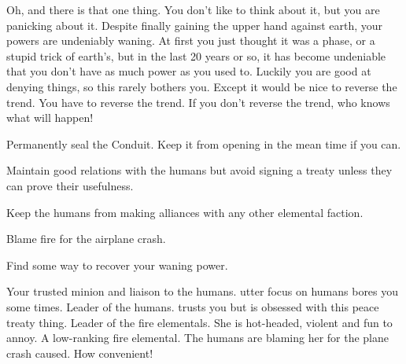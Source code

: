\documentclass[char]{elementals}
\begin{document}
Oh, and there is that one thing. You don't like to think about it, but you are panicking about it. Despite finally gaining the upper hand against earth, your powers are undeniably waning. At first you just thought it was a phase, or a stupid trick of earth's, but in the last 20 years or so, it has become undeniable that you don't have as much power as you used to. Luckily you are good at denying things, so this rarely bothers you. Except it would be nice to reverse the trend. You have to reverse the trend. If you don't reverse the trend, who knows what will happen!

\begin{itemz}[Goals]
	\item  Permanently seal the Conduit. Keep it from opening in the mean time if you can.
	\item  Maintain good relations with the humans but avoid signing a treaty unless they can prove their usefulness.
	\item  Keep the humans from making alliances with any other elemental faction.
	\item  Blame fire for the airplane crash.
	\item  Find some way to recover your waning power.
\end{itemz}

\begin{contacts}
	\contact{\cNaturalist{\intro}} Your trusted minion and liaison to the humans. \cNaturalist{\Their} utter focus on humans bores you some times.
	\contact{\cLeader{\intro}} Leader of the humans. \cLeader{\They} trusts you but is obsessed with this peace treaty thing.
	\contact{\cQueen{\intro}} Leader of the fire elementals. She is hot-headed, violent and fun to annoy.
  \contact{\cJuliet{\intro}} A low-ranking fire elemental. The humans are blaming her for the plane crash \cNaturalist{} caused.  How convenient!
\end{contacts} 
\end{document}
